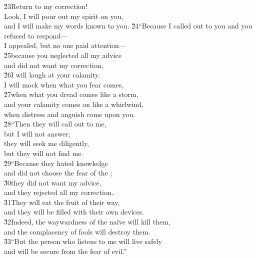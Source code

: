 \begin{poetry}
\poeml \v{23}Return to my correction! \\
\poemll    Look, I will pour out my spirit on you, \\
\poemlll       and I will make my words known to you.
\poeml \v{24}``Because I called out to you and you refused to respond--- \\
\poemll    I appealed, but no one paid attention--- \\
\poeml \v{25}because you neglected all my advice \\
\poemll    and did not want my correction, \\
\poeml \v{26}I will laugh at your calamity. \\
\poemll    I will mock when what you fear comes, \\
\poeml \v{27}when what you dread comes like a storm, \\
\poemll    and your calamity comes on like a whirlwind, \\
\poemlll       when distress and anguish come upon you. \\
\poeml \v{28}``Then they will call out to me, \\
\poemll    but I will not answer; \\
\poeml they will seek me diligently, \\
\poemll    but they will not find me. \\
\poeml \v{29}``Because they hated knowledge \\
\poemll    and did not choose the fear of the ; \\
\poeml \v{30}they did not want my advice, \\
\poemll    and they rejected all my correction. \\
\poeml \v{31}They will eat the fruit of their way, \\
\poemll    and they will be filled with their own devices. \\
\poeml \v{32}Indeed, the waywardness of the na\"{i}ve will kill them, \\
\poemll    and the complacency of fools will destroy them. \\
\poeml \v{33}``But the person who listens to me will live safely \\
\poemll    and will be secure from the fear of evil.''
\end{poetry}

